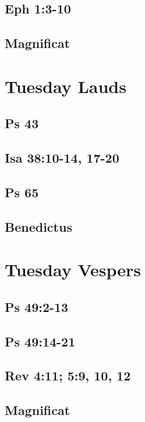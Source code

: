 \subsection{Eph 1:3-10}

\subsection{Magnificat}


\section{Tuesday Lauds}

\subsection{Ps 43}

\subsection{Isa 38:10-14, 17-20}

\subsection{Ps 65}

\subsection{Benedictus}


\section{Tuesday Vespers}

\subsection{Ps 49:2-13}

\subsection{Ps 49:14-21}

\subsection{Rev 4:11; 5:9, 10, 12}

\subsection{Magnificat}


